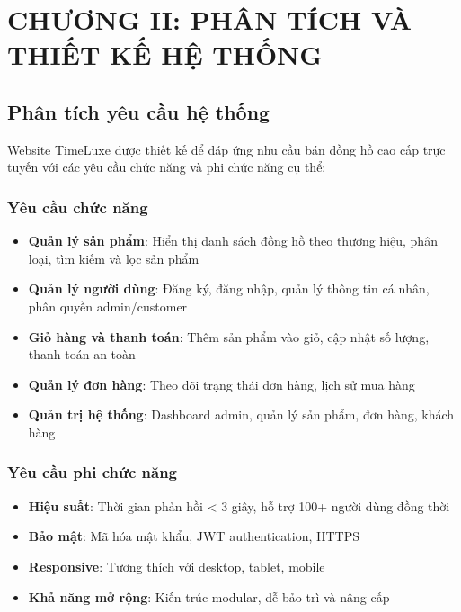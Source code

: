 \setcounter{chapter}{2} 
\chapter*{CHƯƠNG II: PHÂN TÍCH VÀ THIẾT KẾ HỆ THỐNG}

\setcounter{section}{0} %
\renewcommand{\thesection}{\thechapter.\arabic{section}}

\section{Phân tích yêu cầu hệ thống}

Website TimeLuxe được thiết kế để đáp ứng nhu cầu bán đồng hồ cao cấp trực tuyến với các yêu cầu chức năng và phi chức năng cụ thể:

\subsection{Yêu cầu chức năng}
\begin{itemize}
    \item \textbf{Quản lý sản phẩm}: Hiển thị danh sách đồng hồ theo thương hiệu, phân loại, tìm kiếm và lọc sản phẩm
    \item \textbf{Quản lý người dùng}: Đăng ký, đăng nhập, quản lý thông tin cá nhân, phân quyền admin/customer
    \item \textbf{Giỏ hàng và thanh toán}: Thêm sản phẩm vào giỏ, cập nhật số lượng, thanh toán an toàn
    \item \textbf{Quản lý đơn hàng}: Theo dõi trạng thái đơn hàng, lịch sử mua hàng
    \item \textbf{Quản trị hệ thống}: Dashboard admin, quản lý sản phẩm, đơn hàng, khách hàng
\end{itemize}

\subsection{Yêu cầu phi chức năng}
\begin{itemize}
    \item \textbf{Hiệu suất}: Thời gian phản hồi < 3 giây, hỗ trợ 100+ người dùng đồng thời
    \item \textbf{Bảo mật}: Mã hóa mật khẩu, JWT authentication, HTTPS
    \item \textbf{Responsive}: Tương thích với desktop, tablet, mobile
    \item \textbf{Khả năng mở rộng}: Kiến trúc modular, dễ bảo trì và nâng cấp
\end{itemize}

